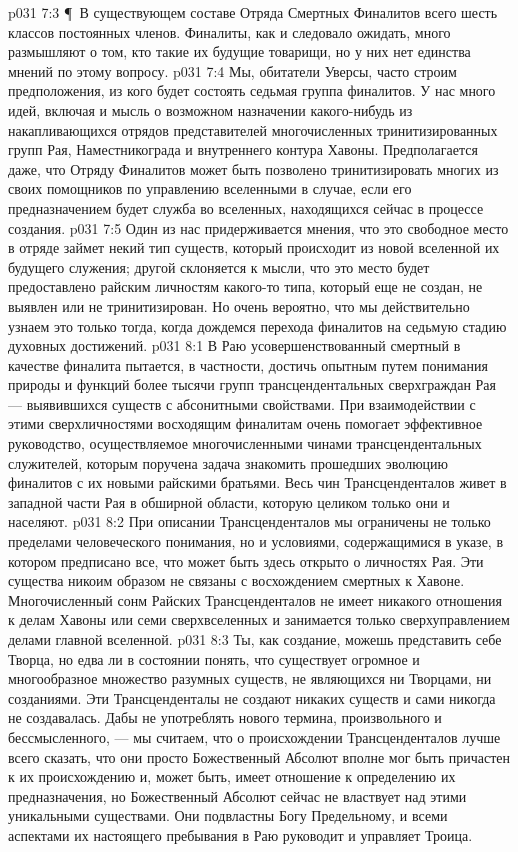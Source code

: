 \vs p031 7:3 \P\ В существующем составе Отряда Смертных Финалитов всего шесть классов постоянных членов. Финалиты, как и следовало ожидать, много размышляют о том, кто такие их будущие товарищи, но у них нет единства мнений по этому вопросу.
\vs p031 7:4 Мы, обитатели Уверсы, часто строим предположения, из кого будет состоять седьмая группа финалитов. У нас много идей, включая и мысль о возможном назначении какого\hyp{}нибудь из накапливающихся отрядов представителей многочисленных тринитизированных групп Рая, Наместникограда и внутреннего контура Хавоны. Предполагается даже, что Отряду Финалитов может быть позволено тринитизировать многих из своих помощников по управлению вселенными в случае, если его предназначением будет служба во вселенных, находящихся сейчас в процессе создания.
\vs p031 7:5 Один из нас придерживается мнения, что это свободное место в отряде займет некий тип существ, который происходит из новой вселенной их будущего служения; другой склоняется к мысли, что это место будет предоставлено райским личностям какого\hyp{}то типа, который еще не создан, не выявлен или не тринитизирован. Но очень вероятно, что мы действительно узнаем это только тогда, когда дождемся перехода финалитов на седьмую стадию духовных достижений.
\vs p031 8:1 В Раю усовершенствованный смертный в качестве финалита пытается, в частности, достичь опытным путем понимания природы и функций более тысячи групп трансцендентальных сверхграждан Рая --- выявившихся существ с абсонитными свойствами. При взаимодействии с этими сверхличностями восходящим финалитам очень помогает эффективное руководство, осуществляемое многочисленными чинами трансцендентальных служителей, которым поручена задача знакомить прошедших эволюцию финалитов с их новыми райскими братьями. Весь чин Трансценденталов живет в западной части Рая в обширной области, которую целиком только они и населяют.
\vs p031 8:2 При описании Трансценденталов мы ограничены не только пределами человеческого понимания, но и условиями, содержащимися в указе, в котором предписано все, что может быть здесь открыто о личностях Рая. Эти существа никоим образом не связаны с восхождением смертных к Хавоне. Многочисленный сонм Райских Трансценденталов не имеет никакого отношения к делам Хавоны или семи сверхвселенных и занимается только сверхуправлением делами главной вселенной.
\vs p031 8:3 Ты, как создание, можешь представить себе Творца, но едва ли в состоянии понять, что существует огромное и многообразное множество разумных существ, не являющихся ни Творцами, ни созданиями. Эти Трансценденталы не создают никаких существ и сами никогда не создавалась. Дабы не употреблять нового термина, произвольного и бессмысленного, --- мы считаем, что о происхождении Трансценденталов лучше всего сказать, что они просто  Божественный Абсолют вполне мог быть причастен к их происхождению и, может быть, имеет отношение к определению их предназначения, но Божественный Абсолют сейчас не властвует над этими уникальными существами. Они подвластны Богу Предельному, и всеми аспектами их настоящего пребывания в Раю руководит и управляет Троица.
